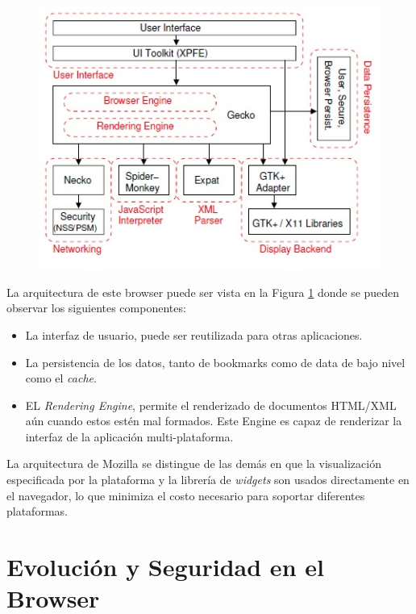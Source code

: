     \begin{figure}[h!t]
        \begin{center}
    		\includegraphics[scale=0.8]{figures/archMoz.jpg}
          \label{fig:archM}
        \end{center}
    \end{figure}
            
    La arquitectura de este browser puede ser vista en la Figura \ref{fig:archM} donde se pueden observar los siguientes componentes:
            \begin{itemize}
                \item La interfaz de usuario, puede ser reutilizada para otras aplicaciones.
                \item La persistencia de los datos, tanto de bookmarks como de data de bajo nivel como el \textit{cache}.
                \item EL \textit{Rendering Engine}, permite el renderizado de documentos HTML/XML aún cuando estos estén mal formados. Este Engine es capaz de renderizar la interfaz de la aplicación multi-plataforma.
            \end{itemize}
    La arquitectura de Mozilla se distingue de las demás en que la visualización especificada por la plataforma y la librería de \textit{widgets} son usados directamente en el navegador, lo que minimiza el costo necesario para soportar diferentes plataformas.
            



\section{Evolución y Seguridad en el Browser}
\label{chap3:EvoandSec}


